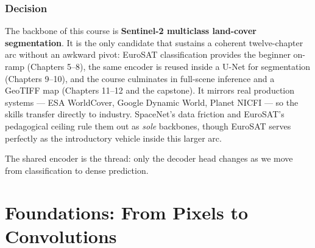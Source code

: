 \documentclass[11pt,openany]{book}
\theoremstyle{definition}
\begin{document}
\section*{Decision}

The backbone of this course is \textbf{Sentinel-2 multiclass land-cover
segmentation}. It is the only candidate that sustains a coherent twelve-chapter
arc without an awkward pivot: EuroSAT classification provides the beginner
on-ramp (Chapters 5--8), the same encoder is reused inside a U-Net for
segmentation (Chapters 9--10), and the course culminates in full-scene
inference and a GeoTIFF map (Chapters 11--12 and the capstone). It mirrors real
production systems --- ESA WorldCover, Google Dynamic World, Planet NICFI ---
so the skills transfer directly to industry. SpaceNet's data friction and
EuroSAT's pedagogical ceiling rule them out as \emph{sole} backbones, though
EuroSAT serves perfectly as the introductory vehicle inside this larger arc.

\begin{center}
\end{center}

\noindent The shared encoder is the thread: only the decoder head changes as we
move from classification to dense prediction.

\mainmatter

\part{Foundations: From Pixels to Convolutions}




\end{document}
